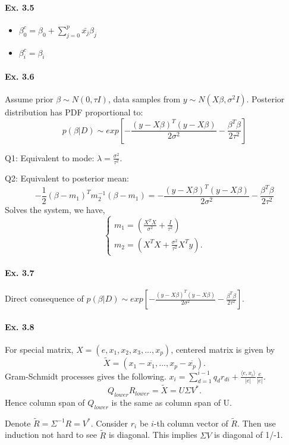 \paragraph*{Ex. 3.5}
\begin{itemize}
    \item $\beta_0^c = \beta_0 + \sum_{j=0}^p\bar{x_j}\beta_j$
    \item $\beta_i^c = \beta_i$
\end{itemize}

\paragraph*{Ex. 3.6}
Assume prior $\beta \sim N(0, \tau I)$, data samples from $y\sim N(X\beta, \sigma^2 I)$. Posterior distribution has PDF proportional to:
$$p(\beta|D) \sim  exp\left[-\frac{(y-X\beta)^T(y-X\beta)}{2\sigma^2}-\frac{\beta^T\beta}{2\tau^2}\right]$$

Q1: Equivalent to mode: $\lambda = \frac{\sigma^2}{\tau^2}.$

Q2: Equivalent to posterior mean:
$$-\frac{1}{2}(\beta - m_1)^Tm_2^{-1}(\beta - m_1) = -\frac{(y-X\beta)^T(y-X\beta)}{2\sigma^2}-\frac{\beta^T\beta}{2\tau^2}$$
Solves the system, we have,
\[
    \begin{cases}
        m_1=(\frac{X^TX}{\sigma^2} + \frac{I}{\tau^2}) \\
        m_2=(X^TX + \frac{\sigma^2}{\tau^2}X^Ty).
    \end{cases}
\]

\paragraph*{Ex. 3.7}
Direct consequence of $p(\beta|D) \sim  exp\left[-\frac{(y-X\beta)^T(y-X\beta)}{2\sigma^2}-\frac{\beta^T\beta}{2\tau^2}\right]$.

\paragraph*{Ex. 3.8}
For special matrix, $X=(e, x_1, x_2, x_3,... , x_p)$, centered matrix is given by
$$\widetilde{X} = (x_1 - \overline{x_1}, ..., x_p - \overline{x_p}).$$
Gram-Schmidt processes gives the following.
$x_i = \sum_{d=1}^{i - 1}q_{d}r_{di} + \frac{\langle e, x_i \rangle}{|e|}\frac{e}{|e|}$.
$$Q_{lower}R_{lower} = \widetilde{X} = U\Sigma V^{*}.$$
Hence column span of $Q_{lower}$ is the same as column span of U.

Denote $\tilde{R} = \Sigma^{-1} R =  V^{*}.$ Consider $r_i$ be $i$-th column vector of $\tilde{R}$. Then use induction not hard to see $\tilde{R}$ is diagonal. This implies $\Sigma V$ is diagonal of 1/-1.

